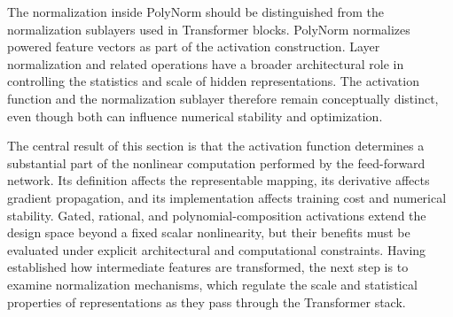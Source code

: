 The normalization inside PolyNorm should be distinguished from
the normalization sublayers used in Transformer blocks. PolyNorm
normalizes powered feature vectors as part of the activation
construction. Layer normalization and related operations have
a broader architectural role in controlling the statistics and
scale of hidden representations. The activation function and
the normalization sublayer therefore remain conceptually
distinct, even though both can influence numerical stability
and optimization.

The central result of this section is that the activation
function determines a substantial part of the nonlinear
computation performed by the feed-forward network. Its
definition affects the representable mapping, its derivative
affects gradient propagation, and its implementation affects
training cost and numerical stability. Gated, rational, and
polynomial-composition activations extend the design space
beyond a fixed scalar nonlinearity, but their benefits must
be evaluated under explicit architectural and computational
constraints. Having established how intermediate features
are transformed, the next step is to examine normalization
mechanisms, which regulate the scale and statistical
properties of representations as they pass through the
Transformer stack.
